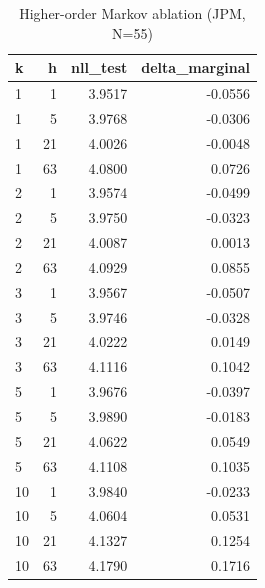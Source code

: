 \begin{table}[ht]
\centering
\caption{Higher-order Markov ablation (JPM, N=55)}
\label{tab:higher-order}
\begin{tabular}{lrrr}
\toprule
k & h & nll_test & delta_marginal \\
\midrule
1 & 1 & 3.9517 & -0.0556 \\
1 & 5 & 3.9768 & -0.0306 \\
1 & 21 & 4.0026 & -0.0048 \\
1 & 63 & 4.0800 & 0.0726 \\
2 & 1 & 3.9574 & -0.0499 \\
2 & 5 & 3.9750 & -0.0323 \\
2 & 21 & 4.0087 & 0.0013 \\
2 & 63 & 4.0929 & 0.0855 \\
3 & 1 & 3.9567 & -0.0507 \\
3 & 5 & 3.9746 & -0.0328 \\
3 & 21 & 4.0222 & 0.0149 \\
3 & 63 & 4.1116 & 0.1042 \\
5 & 1 & 3.9676 & -0.0397 \\
5 & 5 & 3.9890 & -0.0183 \\
5 & 21 & 4.0622 & 0.0549 \\
5 & 63 & 4.1108 & 0.1035 \\
10 & 1 & 3.9840 & -0.0233 \\
10 & 5 & 4.0604 & 0.0531 \\
10 & 21 & 4.1327 & 0.1254 \\
10 & 63 & 4.1790 & 0.1716 \\
\bottomrule
\end{tabular}
\end{table}
